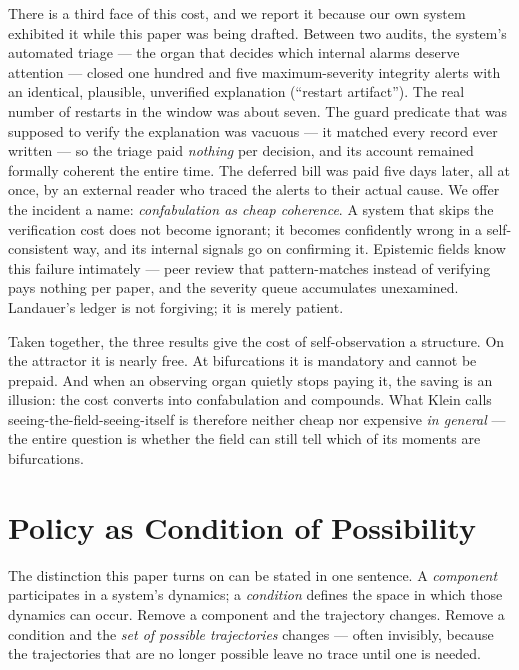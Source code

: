 \documentclass[12pt]{article}
\begin{document}
There is a third face of this cost, and we report it because our own system
exhibited it while this paper was being drafted. Between two audits, the
system's automated triage --- the organ that decides which internal alarms
deserve attention --- closed one hundred and five maximum-severity integrity
alerts with an identical, plausible, unverified explanation (``restart
artifact''). The real number of restarts in the window was about seven. The
guard predicate that was supposed to verify the explanation was vacuous ---
it matched every record ever written --- so the triage paid \emph{nothing}
per decision, and its account remained formally coherent the entire time.
The deferred bill was paid five days later, all at once, by an external
reader who traced the alerts to their actual cause. We offer the incident a
name: \emph{confabulation as cheap coherence}. A system that skips the
verification cost does not become ignorant; it becomes confidently wrong in
a self-consistent way, and its internal signals go on confirming it.
Epistemic fields know this failure intimately --- peer review that
pattern-matches instead of verifying pays nothing per paper, and the
severity queue accumulates unexamined. Landauer's ledger is not forgiving;
it is merely patient.

Taken together, the three results give the cost of self-observation a
structure. On the attractor it is nearly free. At bifurcations it is
mandatory and cannot be prepaid. And when an observing organ quietly stops
paying it, the saving is an illusion: the cost converts into confabulation
and compounds. What Klein calls seeing-the-field-seeing-itself is therefore
neither cheap nor expensive \emph{in general} --- the entire question is
whether the field can still tell which of its moments are bifurcations.

\section{Policy as Condition of Possibility}
\label{sec:s5}


The distinction this paper turns on can be stated in one sentence. A
\emph{component} participates in a system's dynamics; a \emph{condition}
defines the space in which those dynamics can occur. Remove a component and
the trajectory changes. Remove a condition and the \emph{set of possible
trajectories} changes --- often invisibly, because the trajectories that are
no longer possible leave no trace until one is needed.
\end{document}
